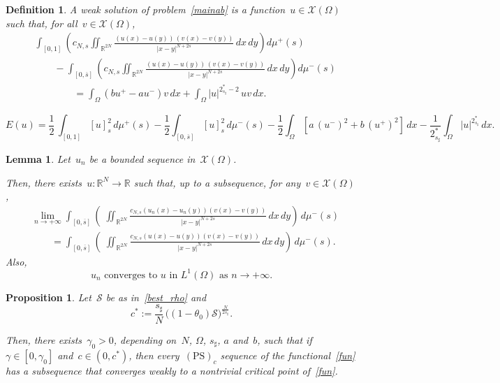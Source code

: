 \documentclass[10pt,a4paper]{amsart}
\newtheorem{lemma}{Lemma}
\newtheorem{proposition}{Proposition}
\newtheorem{definition}{Definition}
\newcommand{\PS}[1]{$(\text{PS})_{#1}$}
\def \R {\mathbb{R}}
\newcommand{\half}{\frac{1}{2}}
\begin{document}
\begin{definition}\label{wsol2}
A weak solution of problem~\eqref{mainab} is a function~$u \in \mathcal{X}(\Omega)$ such that, for all~$ v \in \mathcal{X}(\Omega)$,
\[
\begin{split}
&\int_{[{{ 0 }}, 1]}\left(c_{N,s}\iint_{\R^{2N}} \frac{(u(x) - u(y))\, (v(x) - v(y))}{|x - y|^{N+2s}}\, dx\, dy\right) d\mu^+(s)\\
&\qquad- \int_{[{{ 0 }}, \overline s]}\left(c_{N,s}\iint_{\R^{2N}} \frac{(u(x) - u(y))\, (v(x) - v(y))}{|x - y|^{N+2s}}\, dx\, dy\right) d\mu^-(s)\\
&\qquad\qquad= \int_{\Omega} (bu^+ - a u^-) v\, dx + \int_\Omega |u|^{2_{s_\sharp}^\ast - 2}\, uv\, dx.
\end{split}
\]
\end{definition}

\begin{equation}\label{fun}
E(u) = \half \,\int_{[{{ 0 }}, 1]} [u]^2_{s}\, d\mu^+ (s)
 -\half\int_{[{{ 0 }}, \overline s]} [u]^2_s\, d\mu^-(s) - \half \int_\Omega \left[a\, (u^-)^2 + b\, (u^+)^2\right]\, dx - \frac{1}{2_{s_\sharp}^*} \int_\Omega |u|^{2_{s_\sharp}^*}\, dx.
\end{equation}

\begin{lemma}\label{Vitali}
Let~$u_n$ be a bounded sequence in~$\mathcal X(\Omega)$. 

Then, there exists~$u:\R^N\to\R$ such that, up to a subsequence, for any~$v\in\mathcal X(\Omega)$,
\begin{equation}\label{Vconv}
\begin{split}
&\lim_{n\to+\infty}\int_{[{{ 0 }}, \overline s]} \left(\;\iint_{\R^{2N}} \frac{c_{N,s}(u_n(x)-u_n(y)) (v(x)-v(y))}{|x-y|^{N+2s}} \, dx\, dy\right)\, d\mu^-(s)  \\
&\qquad =\int_{[{{ 0 }}, \overline s]} \left(\;\iint_{\R^{2N}} \frac{c_{N,s}(u(x)-u(y)) (v(x)-v(y))}{|x-y|^{N+2s}} \, dx\, dy\right)\, d\mu^-(s).
\end{split}
\end{equation}
Also, 
\begin{equation}\label{lunoconv}
{\mbox{$u_n$ converges to~$u$ in~$L^1(\Omega)$ as~$n\to+\infty$.}}
\end{equation}
\end{lemma}

\begin{proposition}\label{P51}
Let~$\mathcal S$ be as in~\eqref{best_rho} and
\begin{equation}\label{CASTA}
c^\ast:= \frac{s_\sharp}{N}\, \big((1-\theta_0)\mathcal S \big)^{\frac{N}{2 s_\sharp}}.
\end{equation}

Then, there exists~$\gamma_0>0$, depending on~$N$, $\Omega$,
$s_\sharp$, $a$ and~$b$, such that if~$\gamma\in[0,\gamma_0]$
and~$c \in (0,c^\ast)$,
then every~\PS{c} sequence of the functional~\eqref{fun} has a subsequence that converges weakly to a nontrivial critical point of~\eqref{fun}.
\end{proposition}
\end{document}
